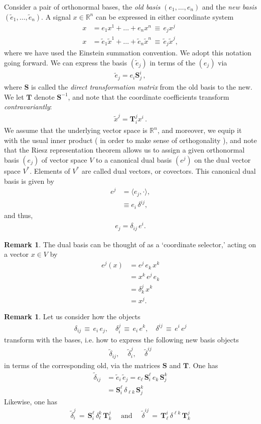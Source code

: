 \documentclass[12pt]{article}
\numberwithin{equation}{section}
\theoremstyle{definition}
\newtheorem{rmk}[thm]{Remark}
\newcommand{		\eq		}[1]	{	\begin{align*}#1\end{align*}	}%
\newcommand{		\ra		}	{	\rangle					}
\newcommand{		\la		}	{	\langle					}
\newcommand{		\1		}	{	\bm{1}					}%
\begin{document}
Consider a pair of orthonormal bases, the \emph{old basis} $(e_1, \dots, e_n)$ and the \emph{new basis} $(\tilde{e}_1, \dots, \tilde{e}_n )$. A signal $x \in \mathbb{R}^n$ can be expressed in either coordinate system 
\eq{
x & = e_1 x^1 + \dots + e_nx^n\, \equiv \,e_jx^j \\
x & = \tilde{e}_1 \tilde{x}^1 + \dots + \tilde{e}_n \tilde{x}^n\, \equiv\, \tilde{e}_j  \tilde{x}^j ,
}
where we have used the Einstein summation convention. We adopt this notation going forward. We can express the basis $( \tilde{e}_j )$ in terms of the $( e_j)$ via
\eq{
\tilde{e}_j = e_i \bm{S}^i_j \, ,
}
where $\bm{S}$ is called the \emph{direct transformation matrix} from the old basis to the new. We let $\bm{T}$ denote $\bm{S}^{-1}$, and note that the coordinate coefficients transform \emph{contravariantly}:
\eq{
\tilde{x}^j =  \bm{T}_i^j x^i\,.
}
We assume that the underlying vector space is $\mathbb{R}^n$, and moreover, we equip it with the usual inner product ( in order to make sense of orthogonality ), and note that the Riesz representation theorem allows us to assign a given orthonormal basis $(e_j)$ of vector space $V$ to a canonical dual basis $(e^j)$ on the dual vector space $V^*$. Elements of $V^*$ are called dual vectors, or covectors. This canonical dual basis is given by
\eq{
e^j &= \la e_j, \cdot \ra , \\
&\equiv e_i  \, \delta^{ij} ,
}
and thus,
\eq{
e_j = \delta_{ij} \, e^i. 
}


\begin{rmk} The dual basis can be thought of as a `coordinate selector,' acting on a vector $x \in V$ by 
\eq{
e^j(x) &= e^j \, e_k \, x^k \\
&=x^k \, e^j \,e_k  \\
&= \delta_k^j  \, x^k \\
&= x^j.
}   
\end{rmk}

\begin{rmk} Let us consider how the objects 
\eq{
\delta_{ij} \, \equiv \, e_i \, e_j ,\quad  \delta_i^j  \, \equiv\, e_i \, e^k ,\quad  \delta^{ij} \,\equiv \, e^i \, e^j
} 
transform with the bases, i.e. how to express the following new basis objects
\eq{
\tilde{\delta}_{ij}, \quad \, \tilde{\delta}_i^j,  \quad \, \tilde{\delta}^{ij}
}
in terms of the corresponding old, via the matrices $\bm{S}$ and $\bm{T}$. One has
\eq{
\tilde{\delta}_{ij} &= \tilde{e}_i\, \tilde{e}_j = e_{\ell}\, \bm{S}^\ell_i  \, e_k  \,\bm{S}^k_j \\ 
&=  \bm{S}^\ell_i \, \delta_{\ell k} \, \bm{S}^k_j 
} 
Likewise, one has
\eq{
\tilde{\delta}_i^j \, = \, \bm{S}_i^\ell \, \delta_\ell^k \, \bm{T}_k^j \quad \text{ and } \quad \tilde{\delta}^{ij} \, = \, \bm{T}_\ell^i \, \delta^{\ell k } \, \bm{T}_k^j
}
\end{rmk}
\end{document}
